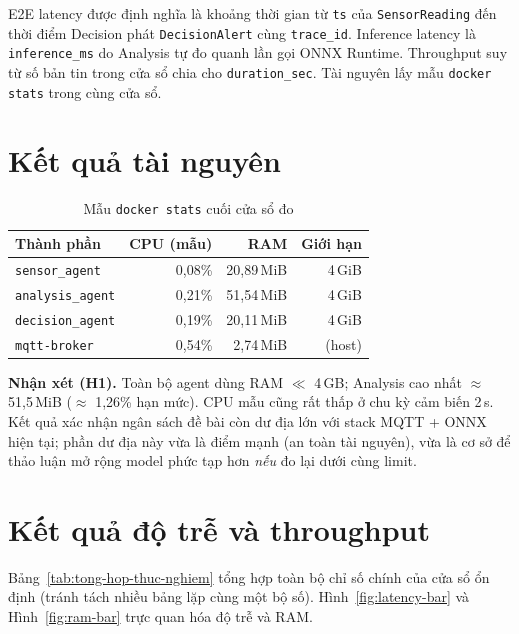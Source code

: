 \documentclass[12pt,a4paper,oneside]{report}
\newcommand{\code}[1]{\texttt{#1}}
\newcommand{\agent}[1]{\texttt{#1}}
\begin{document}
E2E latency được định nghĩa là khoảng thời gian từ \code{ts} của \code{SensorReading} đến thời điểm Decision phát \code{DecisionAlert} cùng \code{trace\_id}. Inference latency là \code{inference\_ms} do Analysis tự đo quanh lần gọi ONNX Runtime. Throughput suy từ số bản tin trong cửa sổ chia cho \code{duration\_sec}. Tài nguyên lấy mẫu \code{docker stats} trong cùng cửa sổ.

\section{Kết quả tài nguyên}

\begin{table}[htbp]
  \centering
  \caption{Mẫu \texttt{docker stats} cuối cửa sổ đo}
  \label{tab:docker-stats}
  \begin{tabular}{lrrr}
    \toprule
    \textbf{Thành phần} & \textbf{CPU (mẫu)} & \textbf{RAM} & \textbf{Giới hạn} \\
    \midrule
    \agent{sensor\_agent} & 0,08\% & 20,89\,MiB & 4\,GiB \\
    \agent{analysis\_agent} & 0,21\% & 51,54\,MiB & 4\,GiB \\
    \agent{decision\_agent} & 0,19\% & 20,11\,MiB & 4\,GiB \\
    \agent{mqtt-broker} & 0,54\% & 2,74\,MiB & (host) \\
    \bottomrule
  \end{tabular}
\end{table}

\noindent\textbf{Nhận xét (H1).} Toàn bộ agent dùng RAM $\ll$ 4\,GB; Analysis cao nhất $\approx$ 51,5\,MiB ($\approx$ 1,26\% hạn mức). CPU mẫu cũng rất thấp ở chu kỳ cảm biến 2\,s. Kết quả xác nhận ngân sách đề bài còn dư địa lớn với stack MQTT + ONNX hiện tại; phần dư địa này vừa là điểm mạnh (an toàn tài nguyên), vừa là cơ sở để thảo luận mở rộng model phức tạp hơn \textit{nếu} đo lại dưới cùng limit.

\section{Kết quả độ trễ và throughput}

Bảng~\ref{tab:tong-hop-thuc-nghiem} tổng hợp toàn bộ chỉ số chính của cửa sổ ổn định (tránh tách nhiều bảng lặp cùng một bộ số). Hình~\ref{fig:latency-bar} và Hình~\ref{fig:ram-bar} trực quan hóa độ trễ và RAM.
\end{document}
